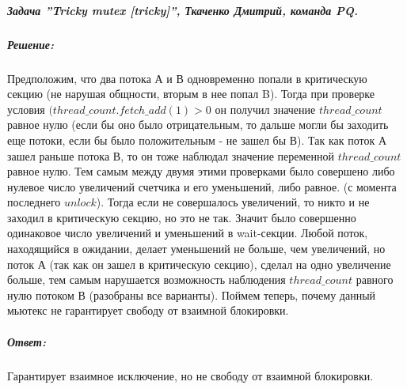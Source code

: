 \documentclass{article}
\begin{document}
\subparagraph{\textit{ Задача ''Tricky mutex [tricky]'', Ткаченко Дмитрий, команда PQ.}}

\subparagraph{Решение:} Предположим, что два потока А и В одновременно попали в критическую секцию (не нарушая общности, вторым в нее попал B). Тогда при проверке условия $(thread\_count.fetch\_add(1) > 0$ он получил значение $thread\_count$ равное нулю (если бы оно было отрицательным, то дальше могли бы заходить еще потоки, если бы было положительным - не зашел бы В). Так как поток А зашел раньше потока В, то он тоже наблюдал значение переменной $thread\_count$ равное нулю. Тем самым между двумя этими проверками было совершено либо нулевое число увеличений счетчика и его уменьшений, либо равное. (с момента последнего $unlock$). Тогда если не совершалось увеличений, то никто и не заходил в критическую секцию, но это не так. Значит было совершенно одинаковое число увеличений и уменьшений в wait-секции. Любой поток, находящийся в ожидании, делает уменьшений не больше, чем увеличений, но поток А (так как он зашел в критическую секцию), сделал на одно увеличение больше, тем самым нарушается возможность наблюдения $thread\_count$ равного нулю потоком В (разобраны все варианты).
\newline
	Поймем теперь, почему данный мьютекс не гарантирует свободу от взаимной блокировки. 

\subparagraph{Ответ:} Гарантирует взаимное исключение, но не свободу от взаимной блокировки.
\end{document}
